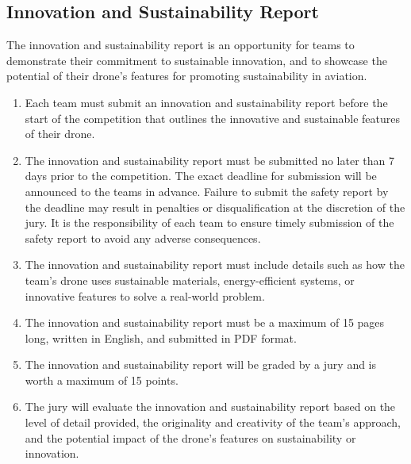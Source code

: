    \subsection{Innovation and Sustainability Report}
    The innovation and sustainability report is an opportunity for teams to demonstrate their commitment to sustainable innovation, and to showcase the potential of their drone's features for promoting sustainability in aviation.
    \begin{enumerate}
    \item Each team must submit an innovation and sustainability report before the start of the competition that outlines the innovative and sustainable features of their drone.
    \item The innovation and sustainability report must be submitted no later than 7 days prior to the competition. The exact deadline for submission will be announced to the teams in advance. Failure to submit the safety report by the deadline may result in penalties or disqualification at the discretion of the jury. It is the responsibility of each team to ensure timely submission of the safety report to avoid any adverse consequences.
    \item The innovation and sustainability report must include details such as how the team's drone uses sustainable materials, energy-efficient systems, or innovative features to solve a real-world problem.
    \item The innovation and sustainability report must be a maximum of 15 pages long, written in English, and submitted in PDF format.
    \item The innovation and sustainability report will be graded by a jury and is worth a maximum of 15 points.
    \item The jury will evaluate the innovation and sustainability report based on the level of detail provided, the originality and creativity of the team's approach, and the potential impact of the drone's features on sustainability or innovation.
    \end{enumerate}
    
